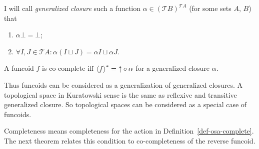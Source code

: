 \begin{defn}
I will call \emph{generalized closure}
such a function $\alpha\in(\mathscr{T}B)^{\mathscr{T}A}$ (for some
sets $A$, $B$) that
\begin{enumerate}
\item $\alpha\bot=\bot$;
\item $\forall I,J\in\mathscr{T}A:\alpha(I\sqcup J)=\alpha I\sqcup\alpha J$.
\end{enumerate}
\end{defn}
\begin{obvious}
A funcoid $f$ is co-complete iff $\left\langle f\right\rangle ^{\ast}=\mathord{\uparrow}\circ\alpha$
for a generalized closure $\alpha$.\end{obvious}
\begin{rem}
Thus funcoids can be considered as a generalization of generalized
closures. A topological space in Kuratowski sense is the same as reflexive
and transitive generalized closure. So topological spaces can be considered
as a special case of funcoids.\end{rem}
Completeness means completeness for the action in
Definition~\ref{def-osa-complete}. The next theorem relates this
condition to co-completeness of the reverse funcoid.

